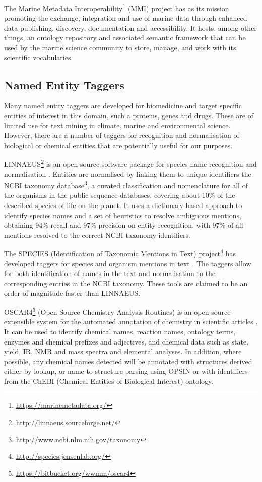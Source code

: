 The Marine Metadata Interoperability\footnote{\url{https://marinemetadata.org/}} (MMI) project has as its mission promoting the exchange, integration and use of marine data through enhanced data publishing, discovery, documentation and accessibility.
It hosts, among other things, an ontology repository and associated semantic framework that can be used by the marine science community to store, manage, and work with its scientific vocabularies.

\subsection{Named Entity Taggers}

Many named entity taggers are developed for biomedicine and target specific entities of interest in this domain, such a proteins, genes and drugs.
These are of limited use for text mining in climate, marine and environmental science. 
However, there are a number of taggers for recognition and normalisation of biological or chemical entities that are potentially useful for our purposes.

LINNAEUS\footnote{\url{http://linnaeus.sourceforge.net/}} is an open-source software package for species name recognition and normalisation \citep{Gerner2010LINNAEUS}. 
Entities are normalised by linking them to unique identifiers the NCBI taxonomy database\footnote{\url{http://www.ncbi.nlm.nih.gov/taxonomy}}, a curated classification and nomenclature for all of the organisms in the public sequence databases, covering about 10\% of the described species of life on the planet.
It uses a dictionary-based approach to identify species names and a set of heuristics to resolve ambiguous mentions, obtaining 94\% recall and 97\% precision on entity recognition, with 97\% of all mentions resolved to the correct NCBI taxonomy identifiers.
 
The SPECIES (Identification of Taxonomic Mentions in Text) project\footnote{\url{http://species.jensenlab.org/}} has developed taggers for species and organism mentions in text \citep{Pafilis2013SPECIES}. 
The taggers allow for both identification of names in the text and normalisation to the corresponding entries in the NCBI taxonomy.
These tools are claimed to be an order of magnitude faster than LINNAEUS.

OSCAR4\footnote{\url{https://bitbucket.org/wwmm/oscar4}} (Open Source Chemistry Analysis Routines) is an open source extensible system for the automated annotation of chemistry in scientific articles \citep{Jessop2011OSCAR4}.
It can be used to identify chemical names, reaction names, ontology terms, enzymes and chemical prefixes and adjectives, and chemical data such as state, yield, IR, NMR and mass spectra and elemental analyses. 
In addition, where possible, any chemical names detected will be annotated with structures derived either by lookup, or name-to-structure parsing using OPSIN or with identifiers from the ChEBI (Chemical Entities of Biological Interest) ontology.

